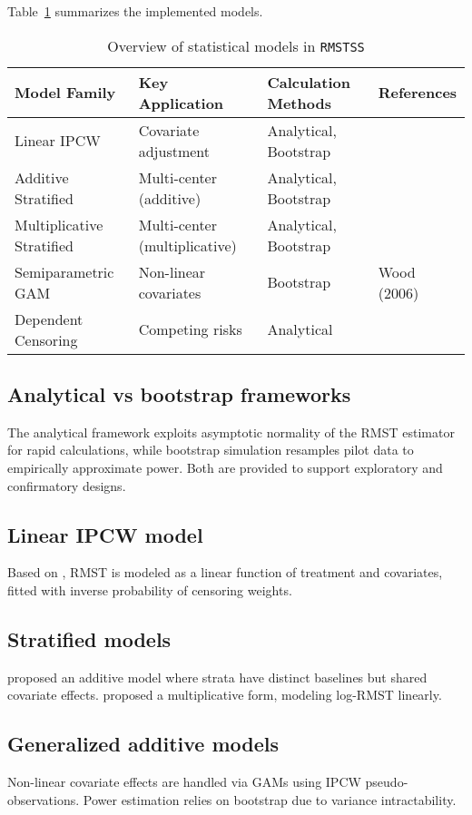 \documentclass[article]{jss}
\begin{document}
Table~\ref{tab:model_overview} summarizes the implemented models.

\begin{table}[h!]
\centering
\caption{Overview of statistical models in \texttt{RMSTSS}}
\label{tab:model_overview}
\begin{tabular}{@{}llll@{}}
\toprule
Model Family & Key Application & Calculation Methods & References \\ \midrule
Linear IPCW & Covariate adjustment & Analytical, Bootstrap & \citet{tian2014} \\
Additive Stratified & Multi-center (additive) & Analytical, Bootstrap & \citet{zhang2024} \\
Multiplicative Stratified & Multi-center (multiplicative) & Analytical, Bootstrap & \citet{wang2019} \\
Semiparametric GAM & Non-linear covariates & Bootstrap & Wood (2006) \\
Dependent Censoring & Competing risks & Analytical & \citet{wang2018} \\
\bottomrule
\end{tabular}
\end{table}

\subsection{Analytical vs bootstrap frameworks}
The analytical framework exploits asymptotic normality of the RMST estimator for rapid calculations, while bootstrap simulation resamples pilot data to empirically approximate power. Both are provided to support exploratory and confirmatory designs.

\subsection{Linear IPCW model}
Based on \citet{tian2014}, RMST is modeled as a linear function of treatment and covariates, fitted with inverse probability of censoring weights. 

\subsection{Stratified models}
\citet{zhang2024} proposed an additive model where strata have distinct baselines but shared covariate effects. \citet{wang2019} proposed a multiplicative form, modeling log-RMST linearly.

\subsection{Generalized additive models}
Non-linear covariate effects are handled via GAMs using IPCW pseudo-observations. Power estimation relies on bootstrap due to variance intractability.
\end{document}
